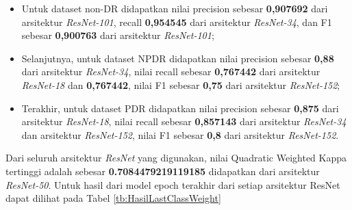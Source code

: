 \begin{itemize}
	
	\item Untuk dataset non-DR didapatkan nilai precision sebesar \textbf{0,907692} dari arsitektur \emph{ResNet-101}, recall \textbf{0,954545} dari arsitektur \emph{ResNet-34}, dan F1 sebesar \textbf{0,900763} dari arsitektur \emph{ResNet-101};
	
	\item Selanjutnya, untuk dataset NPDR didapatkan nilai precision sebesar \textbf{0,88} dari arsitektur \emph{ResNet-34}, nilai recall sebesar \textbf{0,767442} dari arsitektur \emph{ResNet-18} dan \textbf{0,767442}, nilai F1 sebesar \textbf{0,75} dari arsitektur \emph{ResNet-152};
	
	\item Terakhir, untuk dataset PDR didapatkan nilai precision sebesar \textbf{0,875} dari arsitektur \emph{ResNet-18}, nilai recall sebesar \textbf{0,857143} dari arsitektur \emph{ResNet-34} dan arsitektur \emph{ResNet-152}, nilai F1 sebesar \textbf{0,8} dari arsitektur \emph{ResNet-152}.
	
\end{itemize}

Dari seluruh arsitektur \emph{ResNet} yang digunakan, nilai Quadratic Weighted Kappa tertinggi adalah sebesar \textbf{0.7084479219119185} didapatkan dari arsitektur \emph{ResNet-50}. Untuk hasil dari model epoch terakhir dari setiap arsitektur ResNet dapat dilihat pada Tabel \ref{tb:HasilLastClassWeight}

\pagebreak


